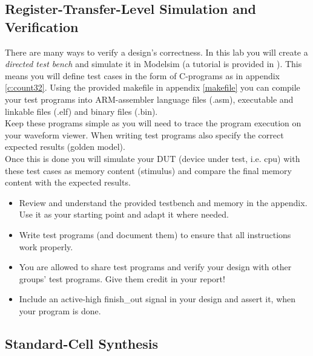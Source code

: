 \subsection{Register-Transfer-Level Simulation and Verification}
There are many ways to verify a design's correctness. In this lab you will create a \textit{directed test bench} and simulate it in Modelsim (a tutorial is provided in \cite{mentor}). This means you will define test cases in the form of C-programs as in appendix \ref{c:count32}. Using the provided makefile in appendix \ref{makefile} you can compile your test programs into ARM-assembler language files (.asm), executable and linkable files (.elf) and binary files (.bin).\\
Keep these programs simple as you will need to trace the program execution on your waveform viewer. When writing test programs also specify the correct expected results (golden model).\\
Once this is done you will simulate your DUT (device under test, i.e. cpu) with these test cases as memory content (stimulus) and compare the final memory content with the expected results.\\
\begin{itemize}
\item Review and understand the provided testbench and memory in the appendix. Use it as your starting point and adapt it where needed.
\item Write test programs (and document them) to ensure that all instructions work properly.
\item You are allowed to share test programs and verify your design with other groups' test programs. Give them credit in your report!
\item Include an active-high finish\_out signal in your design and assert it, when your program is done.
\end{itemize}


\subsection{Standard-Cell Synthesis}
